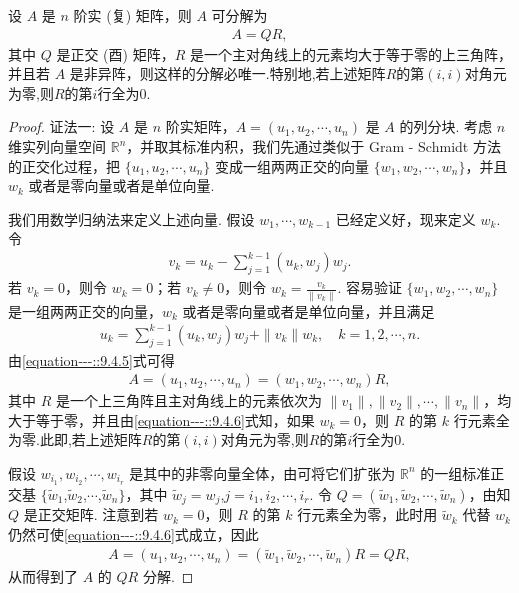 \documentclass[../../main.tex]{subfiles}%
\begin{document}
\begin{theorem}[矩阵的QR分解]\label{theorem:矩阵的QR分解}
设 $A$ 是 $n$ 阶实 (复) 矩阵，则 $A$ 可分解为
\begin{align*}
A = QR,
\end{align*}
其中 $Q$ 是正交 (酉) 矩阵，$R$ 是一个主对角线上的元素均大于等于零的上三角阵，并且若 $A$ 是非异阵，则这样的分解必唯一.特别地,若上述矩阵$R$的第$(i,i)$对角元为零,则$R$的第$i$行全为0.
\end{theorem}
\begin{proof}

{\color{blue}证法一:}
设 $A$ 是 $n$ 阶实矩阵，$A = (u_1,u_2,\cdots,u_n)$ 是 $A$ 的列分块. 考虑 $n$ 维实列向量空间 $\mathbb{R}^n$，并取其标准内积，我们先通过类似于 Gram - Schmidt 方法的正交化过程，把 $\{u_1,u_2,\cdots,u_n\}$ 变成一组两两正交的向量 $\{w_1,w_2,\cdots,w_n\}$，并且 $w_k$ 或者是零向量或者是单位向量.

我们用数学归纳法来定义上述向量. 假设 $w_1,\cdots,w_{k - 1}$ 已经定义好，现来定义 $w_k$. 令
\begin{align*}
v_k = u_k - \sum_{j = 1}^{k - 1}(u_k,w_j)w_j.
\end{align*}
若 $v_k = 0$，则令 $w_k = 0$；若 $v_k \neq 0$，则令 $w_k = \frac{v_k}{\|v_k\|}$. 容易验证 $\{w_1,w_2,\cdots,w_n\}$ 是一组两两正交的向量，$w_k$ 或者是零向量或者是单位向量，并且满足
\begin{align}
u_k = \sum_{j = 1}^{k - 1}(u_k,w_j)w_j + \|v_k\|w_k,\quad k = 1,2,\cdots,n.\label{equation---::9.4.5}
\end{align}
由\eqref{equation---::9.4.5}式可得
\begin{align}
A = (u_1,u_2,\cdots,u_n) = (w_1,w_2,\cdots,w_n)R,\label{equation---::9.4.6}
\end{align}
其中 $R$ 是一个上三角阵且主对角线上的元素依次为 $\|v_1\|,\|v_2\|,\cdots,\|v_n\|$，均大于等于零，并且由\eqref{equation---::9.4.6}式知，如果 $w_k = 0$，则 $R$ 的第 $k$ 行元素全为零.此即,若上述矩阵$R$的第$(i,i)$对角元为零,则$R$的第$i$行全为0.

假设 $w_{i_1},w_{i_2},\cdots,w_{i_r}$ 是其中的非零向量全体，由可将它们扩张为 $\mathbb{R}^n$ 的一组标准正交基 $\{\widetilde{w}_1$,$\widetilde{w}_2$,$\cdots$,$\widetilde{w}_n\}$，其中 $\widetilde{w}_j = w_j$,$j = i_1,i_2,\cdots,i_r$. 令 $Q = (\widetilde{w}_1,\widetilde{w}_2,\cdots,\widetilde{w}_n)$，由知 $Q$ 是正交矩阵. 注意到若 $w_k = 0$，则 $R$ 的第 $k$ 行元素全为零，此时用 $\widetilde{w}_k$ 代替 $w_k$ 仍然可使\eqref{equation---::9.4.6}式成立，因此
\begin{align*}
A = (u_1,u_2,\cdots,u_n) = (\widetilde{w}_1,\widetilde{w}_2,\cdots,\widetilde{w}_n)R = QR,
\end{align*}
从而得到了 $A$ 的 $QR$ 分解.


\end{proof}
\end{document}
